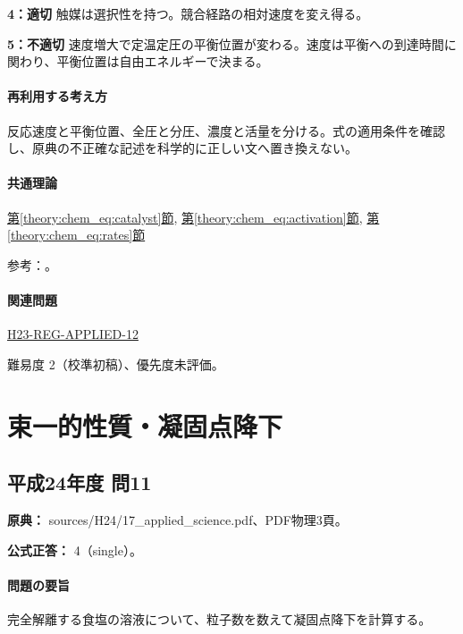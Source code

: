 \noindent\textbf{4：適切} 触媒は選択性を持つ。競合経路の相対速度を変え得る。\par

\noindent\textbf{5：不適切} 速度増大で定温定圧の平衡位置が変わる。速度は平衡への到達時間に関わり、平衡位置は自由エネルギーで決まる。\par

\paragraph{再利用する考え方} 反応速度と平衡位置、全圧と分圧、濃度と活量を分ける。式の適用条件を確認し、原典の不正確な記述を科学的に正しい文へ置き換えない。

\paragraph{共通理論} \hyperref[theory:chem_eq:catalyst]{第\ref*{theory:chem_eq:catalyst}節}, \hyperref[theory:chem_eq:activation]{第\ref*{theory:chem_eq:activation}節}, \hyperref[theory:chem_eq:rates]{第\ref*{theory:chem_eq:rates}節}

\par 参考：\cite{iupac_greenbook2012}。

\paragraph{関連問題} \hyperref[q:h23-reg-applied-12]{H23-REG-APPLIED-12}

\par 難易度 2（校準初稿）、優先度未評価。

\section{束一的性質・凝固点降下}

\subsection{平成24年度 問11}
\label{q:h24-reg-applied-11}

\noindent\textbf{原典：} sources/H24/17\_applied\_science.pdf、PDF物理3頁。

\textbf{公式正答：} 4（single）。

\paragraph{問題の要旨} 完全解離する食塩の溶液について、粒子数を数えて凝固点降下を計算する。

